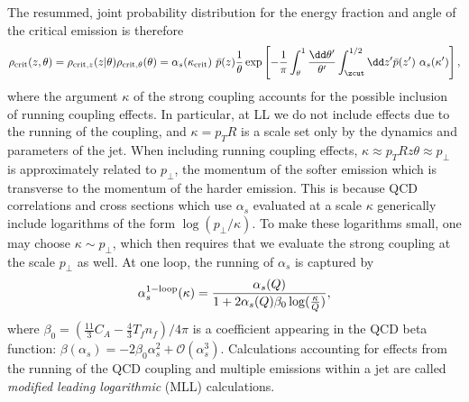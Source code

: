 \documentclass[letterpaper,11pt]{article}
\begin{document}
The resummed, joint probability distribution for the energy fraction and angle of the critical emission is therefore
%
\begin{equation}
    \rho_{\rm crit}(z,\theta)
    =
    \rho_{{\rm crit}, z}(z | \theta)
    \rho_{{\rm crit}, \theta}(\theta)
    =
    \alpha_s(\kappa_{\rm crit})
    ~
    \bar{p}(z)
    \frac{1}{\theta}
    \exp\left[
    - \frac{1}{\pi}
    \int_{\theta}^1
    \frac{\dd\theta'}{\theta'}
    \int_{\zcut}^{1/2} \dd z'
    \bar{p}(z')~
    \alpha_s(\kappa')
    \right]
    ,
\end{equation}
where the argument \(\kappa\) of the strong coupling accounts for the possible inclusion of running coupling effects.
%
In particular, at LL we do not include effects due to the running of the coupling, and \(\kappa = p_T R\) is a scale set only by the dynamics and parameters of the jet.
%
When including running coupling effects, \(\kappa \approx p_T R z \theta \approx p_\perp\) is approximately related to \(p_\perp\), the momentum of the softer emission which is transverse to the momentum of the harder emission.
%
This is because QCD correlations and cross sections which use \(\alpha_s\) evaluated at a scale \(\kappa\) generically include logarithms of the form \(\log(p_{\perp} / \kappa)\).
%
To make these logarithms small, one may choose \(\kappa \sim p_\perp\), which then requires that we evaluate the strong coupling at the scale \(p_\perp\) as well.
%
At one loop, the running of \(\alpha_s\) is captured by
\begin{align}
    \alpha^{\rm 1-loop}_s(\kappa)
    =
    \frac{\alpha_s(Q)}{1 + 2\alpha_s(Q) \beta_0 \log(\frac{\kappa}{Q})}
    ,
\end{align}
where \(\beta_0 = (\frac{11}{3}C_A - \frac{4}{3} T_f n_f)/4\pi\) is a coefficient appearing in the QCD beta function: \(\beta(\alpha_s) = -2\beta_0 \alpha_s^2 + \mathcal{O}(\alpha_s^3)\).
%
Calculations accounting for effects from the running of the QCD coupling and multiple emissions within a jet are called \textit{modified leading logarithmic} (MLL) calculations.
\end{document}
